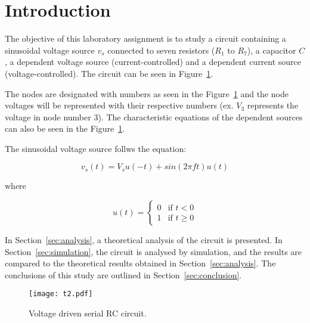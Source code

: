 \newpage
\section{Introduction}
\label{sec:introduction}

The objective of this laboratory assignment is to study a circuit containing a
sinusoidal voltage source $v_s$ connected to seven resistors ($R_1$ to $R_7$), a capacitor $C$, a dependent voltage source (current-controlled) and a dependent current source (voltage-controlled).
The circuit can be seen in Figure~\ref{fig:t2}.

The nodes are designated with numbers as seen in the Figure~\ref{fig:t2} and the node voltages will be represented with their respective numbers (ex. $V_3$ represents the voltage in node number 3). The characteristic equations of the dependent sources can also be seen in the Figure~\ref{fig:t2}. 

The sinusoidal voltage source follws the equation:

\begin {equation}
	v_s( t )  = V_s u( -t ) + sin( 2 \pi f t ) u( t ) 
	\label{eq:vs}
\end{equation}

where 

\begin{equation}
    u(t)=  \begin{cases}
    0 & \mbox{if } t<0 \\ 1 &\mbox{if } t\geq 0
    \end{cases}
\end{equation}

In Section~\ref{sec:analysis}, a theoretical analysis of the circuit is
presented. In Section~\ref{sec:simulation}, the circuit is analysed by
simulation, and the results are compared to the theoretical results obtained in
Section~\ref{sec:analysis}. The conclusions of this study are outlined in
Section~\ref{sec:conclusion}.

\begin{figure}[h] \centering
\texttt{[image: t2.pdf]}
\caption{Voltage driven serial RC circuit.}
\label{fig:t2}
\end{figure}

